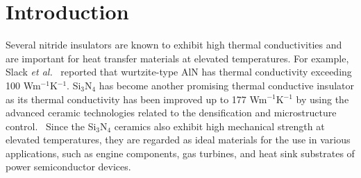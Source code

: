 \documentclass[twocolumn,amsmath,amssymb,a4paper,prb,superscriptaddress,floatfix]{revtex4-1}
\begin{document}
\maketitle

\section{Introduction}
Several nitride insulators are known to exhibit high thermal conductivities and
are important for heat transfer materials at elevated temperatures. For example,
Slack {\it et al.}~\cite{slack} reported that wurtzite-type AlN has thermal
conductivity exceeding 100 Wm$^{-1}$K$^{-1}$. Si$_3$N$_4$ has become another
promising thermal conductive insulator as its thermal conductivity has been
improved up to 177 Wm$^{-1}$K$^{-1}$ by using the advanced ceramic technologies
related to the densification and microstructure
control.~\cite{zhou,hirao-rev,watari,hirosaki} Since the Si$_3$N$_4$ ceramics
also exhibit high mechanical strength at elevated temperatures, they are
regarded as ideal materials for the use in various applications, such as engine
components, gas turbines, and heat sink substrates of power semiconductor
devices.
\end{document}
